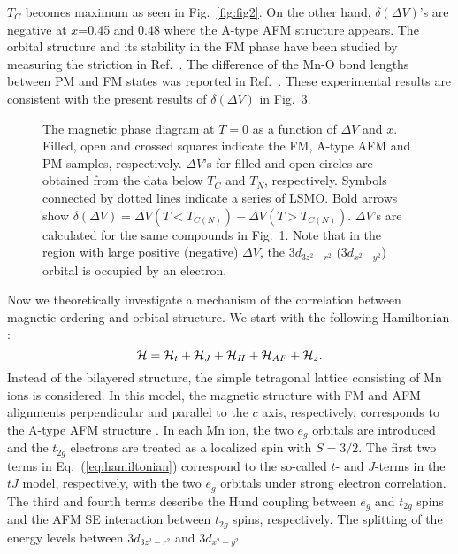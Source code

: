 $T_C$ becomes maximum as seen in Fig.~\ref{fig:fig2}. 
On the other hand, 
$\delta (\Delta V)$'s are negative at $x$=0.45 and 0.48 where  
the A-type AFM structure appears.
%
The orbital structure and its stability in the FM phase have been studied by 
measuring the striction in Ref.~. 
The difference of the Mn-O bond lengths between PM and FM 
states was reported in Ref.~. 
These experimental results are consistent with the present results of $\delta (\Delta V)$ in Fig.~3. 
%
%
%
\begin{figure}
\columnwidth
\centerline{}
\caption{The magnetic phase diagram at $T=0$ as a function of $\Delta V$ and $x$.
Filled, open and crossed squares indicate the FM, A-type AFM and 
PM samples, respectively. 
$\Delta V$'s for filled and open circles are obtained  
from the data below $T_{C}$ and $T_N$, respectively.
Symbols connected by dotted lines indicate a series of LSMO. 
Bold arrows show $\delta (\Delta V)=\Delta V(T<T_{C(N)})-\Delta V(T>T_{C(N)})$. 
$\Delta V$'s are calculated for the same compounds in Fig.~1.
Note that in the region with large positive (negative) $\Delta V$, 
the $3d_{3z^2-r^2}$ ($3d_{x^2-y^2}$) orbital is occupied by an electron.}
\label{fig:fig3}
\end{figure}
%
\par
%
Now we theoretically investigate a mechanism of the correlation between 
magnetic ordering and orbital structure. 
We start with the following Hamiltonian \cite{ishihara,ishihara2,hamiltonian}:  
%
\begin{equation}
{\cal H}={\cal H}_t+{\cal H}_J+{\cal H}_H+{\cal H}_{AF}+{\cal H}_z .  
\label{eq:hamiltonian}
\end{equation}
Instead of the bilayered structure, 
the simple tetragonal lattice consisting of Mn ions is considered.  
In this model, the magnetic structure with FM and AFM 
alignments perpendicular and parallel to the $c$ axis, respectively, 
corresponds to the A-type AFM structure \cite{aafm}. 
%
In each Mn ion, the two $e_g$ orbitals are introduced and 
the $t_{2g}$ electrons are treated as a localized spin with $S=3/2$. 
The first two terms in Eq.~(\ref{eq:hamiltonian}) correspond to the so-called $t$- and $J$-terms 
in the $tJ$ model, respectively, with the  two $e_g$ orbitals under strong electron correlation.  
The third and fourth terms describe the Hund coupling between $e_g$ and $t_{2g}$ spins
and the AFM SE interaction between $t_{2g}$ spins, respectively. 
The splitting of the energy levels between $3d_{3z^2-r^2}$ and $3d_{x^2-y^2}$ 
